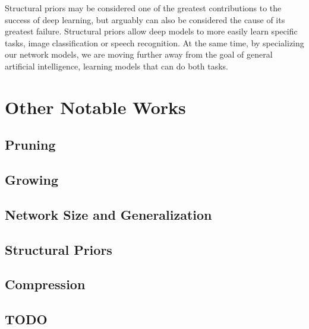 \documentclass[thesis]{subfiles}
\begin{document}
    Structural priors may be considered one of the greatest contributions to the success of deep learning, but arguably can also be considered the cause of its greatest failure. Structural priors allow deep models to more easily learn specific tasks, \eg image classification or speech recognition. At the same time, by specializing our network models, we are moving further away from the goal of general artificial intelligence, \ie learning models that can do both tasks.
    
\section{Other Notable Works}
\subsection{Pruning}
\citep{mozer1989using, mozer1989skeletonization, castellano1997iterative,gorodkin1993quantitative,han2016dsd,han2015learning,setiono1997penalty,}

\subsection{Growing}
\citep{Fahlman1989,frean1990upstart,}

\subsection{Network Size and Generalization}
\citep{denker1987large, giles1987learning, hinton1987learning, lecun1989generalization, ahmad1989scaling,hanson1989comparing,}

\subsection{Structural Priors}
\citep{Fuk80,lecun1989backpropagation,}

\subsection{Compression}
\citep{han2015deep,Kim2016,ullrich2017soft,}

\subsection{TODO}
\citep{mackay1992practical,schwartz1990exhaustive,}

    
\end{document}
